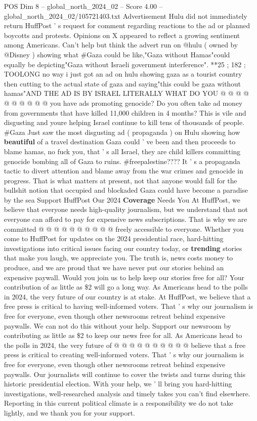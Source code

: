 \begin{textsample}{POS Dim 8 – global\_north\_2024\_02 – Score 4.00 – global\_north\_2024\_02/105721403.txt}
Advertisement Hulu did not immediately return HuffPost ' s request for comment regarding reactions to the ad or planned boycotts and protests.
Opinions on X appeared to reflect a growing sentiment among Americans.
Can't help but think the advert run on @hulu ( owned by @Disney ) showing what \#Gaza could be like,"Gaza without Hamas"could equally be depicting"Gaza without Israeli government interference". **25 ; 182 ; TOOLONG no way i just got an ad on hulu showing gaza as a tourist country then cutting to the actual state of gaza and saying"this could be gaza without hamas"AND THE AD IS BY ISRAEL LITERALLY WHAT DO YOU @ @ @ @ @ @ @ @ @ @ you have ads promoting genocide?
Do you often take ad money from governments that have killed 11,000 children in 4 months?
This is vile and disgusting and youre helping Israel continue to kill tens of thousands of people. \#Gaza Just saw the most disgusting ad ( propaganda ) on Hulu showing how \textbf{beautiful} of a travel destination Gaza could ' ve been and then proceeds to blame hamas, no fuck you, that ' s all Israel, they are child killers committing genocide bombing all of Gaza to ruins. \#freepalestine????
It ' s a propaganda tactic to divert attention and blame away from the war crimes and genocide in progress.
That is what matters at present, not that anyone would fall for the bullshit notion that occupied and blockaded Gaza could have become a paradise by the sea Support HuffPost Our 2024 \textbf{Coverage} Needs You At HuffPost, we believe that everyone needs high-quality journalism, but we understand that not everyone can afford to pay for expensive news subscriptions.
That is why we are committed @ @ @ @ @ @ @ @ @ @ freely accessible to everyone.
Whether you come to HuffPost for updates on the 2024 presidential race, hard-hitting investigations into critical issues facing our country today, or \textbf{trending} stories that make you laugh, we appreciate you.
The truth is, news costs money to produce, and we are proud that we have never put our stories behind an expensive paywall.
Would you join us to help keep our stories free for all?
Your contribution of as little as \$2 will go a long way.
As Americans head to the polls in 2024, the very future of our country is at stake.
At HuffPost, we believe that a free press is critical to having well-informed voters.
That ' s why our journalism is free for everyone, even though other newsrooms retreat behind expensive paywalls.
We can not do this without your help.
Support our newsroom by contributing as little as \$2 to keep our news free for all.
As Americans head to the polls in 2024, the very future of @ @ @ @ @ @ @ @ @ @ believe that a free press is critical to creating well-informed voters.
That ' s why our journalism is free for everyone, even though other newsrooms retreat behind expensive paywalls.
Our journalists will continue to cover the twists and turns during this historic presidential election.
With your help, we ' ll bring you hard-hitting investigations, well-researched analysis and timely takes you can't find elsewhere.
Reporting in this current political climate is a responsibility we do not take lightly, and we thank you for your support.


\end{textsample}

